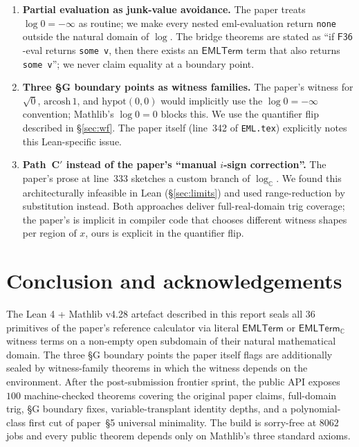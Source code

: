 \documentclass[11pt,a4paper]{article}
\theoremstyle{plain}
\theoremstyle{definition}
\newcommand{\C}{\mathbb{C}}
\newcommand{\eml}{\mathrm{eml}}
\newcommand{\EMLT}{\mathsf{EMLTerm}}
\newcommand{\EMLTC}{\mathsf{EMLTerm}_\C}
\newcommand{\F}{\mathsf{F36}}
\begin{document}
\begin{enumerate}[leftmargin=*, topsep=2pt, itemsep=4pt]
  \item \textbf{Partial evaluation as junk-value avoidance.} The paper
    treats $\log 0 = -\infty$ as routine; we make every nested
    $\eml$-evaluation return \texttt{none} outside the natural domain
    of $\log$. The bridge theorems are stated as ``if
    $\F$-eval returns \texttt{some\,v}, then there exists an $\EMLT$
    term that also returns \texttt{some\,v}''; we never claim
    equality at a boundary point.
  \item \textbf{Three §G boundary points as witness families.} The
    paper's witness for $\sqrt{0}$, $\mathrm{arcosh}\,1$, and
    $\mathrm{hypot}(0, 0)$ would implicitly use the $\log 0 = -\infty$
    convention; Mathlib's $\log 0 = 0$ blocks this. We use the
    quantifier flip described in \S\ref{sec:wf}. The paper itself
    (line~342 of \texttt{EML.tex}) explicitly notes this Lean-specific
    issue.
  \item \textbf{Path~C$'$ instead of the paper's ``manual $i$-sign
    correction''.} The paper's prose at line~333 sketches a custom
    branch of $\log_\C$. We found this architecturally infeasible in
    Lean (\S\ref{sec:limits}) and used range-reduction by substitution
    instead. Both approaches deliver full-real-domain trig coverage;
    the paper's is implicit in compiler code that chooses different
    witness shapes per region of $x$, ours is explicit in the
    quantifier flip.
\end{enumerate}

\section{Conclusion and acknowledgements}\label{sec:conclusion}

The Lean 4 + Mathlib v4.28 artefact described in this report seals all
$36$ primitives of the paper's reference calculator via literal
$\EMLT$ or $\EMLTC$ witness terms on a non-empty open subdomain of
their natural mathematical domain. The three §G boundary points the
paper itself flags are additionally sealed by witness-family theorems
in which the witness depends on the environment. After the
post-submission frontier sprint, the public API exposes $100$
machine-checked theorems covering the original paper claims,
full-domain trig, §G boundary fixes, variable-transplant identity
depths, and a polynomial-class first cut of paper~§5 universal
minimality. The build is sorry-free at $8062$ jobs and every public
theorem depends only on Mathlib's three standard axioms.
\end{document}
